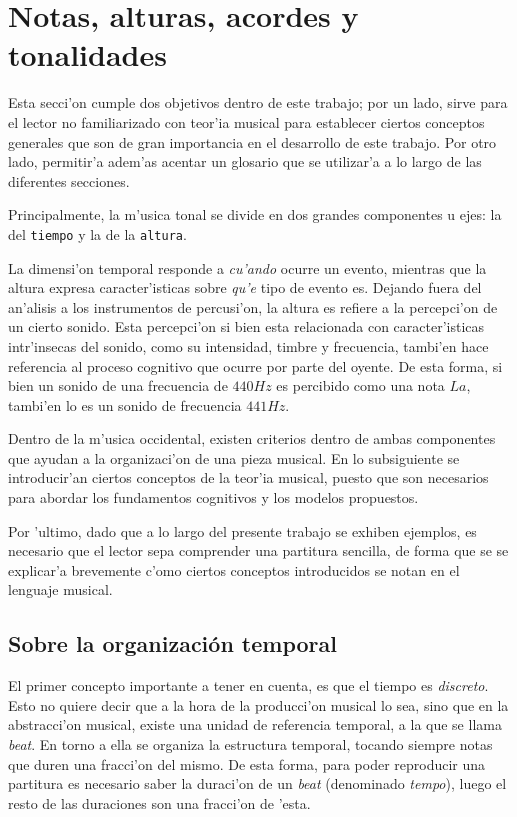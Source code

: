 \section{Notas, alturas, acordes y tonalidades}
\label{sec:musical_intro}
Esta secci'on cumple dos objetivos dentro de este trabajo; por un lado, sirve para el lector no familiarizado con teor'ia musical para establecer
ciertos conceptos generales que son de gran importancia en el desarrollo de este trabajo. Por otro lado, permitir'a adem'as acentar un glosario
que se utilizar'a a lo largo de las diferentes secciones.

Principalmente, la m'usica tonal se divide en dos grandes componentes u ejes: la del \texttt{tiempo} y la de la \texttt{altura}. 

La dimensi'on temporal responde a \emph{cu'ando} ocurre un evento, mientras que la altura expresa caracter'isticas sobre \emph{qu'e}
tipo de evento es.  Dejando fuera del an'alisis a los instrumentos de percusi'on, la altura es refiere a la percepci'on de un cierto sonido. 
Esta percepci'on si bien esta relacionada con caracter'isticas intr'insecas del sonido, como su intensidad, timbre y frecuencia, 
tambi'en hace referencia
al proceso cognitivo que ocurre por parte del oyente. De esta forma, si bien un sonido de una frecuencia de $440Hz$ es percibido como una nota 
$La$, tambi'en lo es un sonido de frecuencia $441Hz$.

Dentro de la m'usica occidental, existen criterios dentro de ambas componentes que ayudan a la organizaci'on de una pieza musical. 
En lo subsiguiente se introducir'an ciertos conceptos de la teor'ia musical, puesto que son necesarios
para abordar los fundamentos cognitivos y los modelos propuestos. 

Por 'ultimo, dado que a lo largo del presente trabajo se exhiben ejemplos, es necesario que el lector sepa comprender una partitura sencilla, de forma que se se 
explicar'a brevemente c'omo ciertos conceptos introducidos se notan en el lenguaje musical.

\subsection{Sobre la organizaci\'on temporal}
El primer concepto importante a tener en cuenta, es que el tiempo es \emph{discreto}. Esto no quiere decir que a la hora de la producci'on musical lo sea, sino que 
en la abstracci'on musical, existe una unidad de referencia temporal, a la que se llama \emph{beat}. En torno a ella se organiza la estructura temporal, tocando
siempre notas que duren una fracci'on del mismo. De esta forma, para poder reproducir una partitura es necesario saber la duraci'on de un \emph{beat} (denominado
\emph{tempo}), luego el resto de las duraciones son una fracci'on de 'esta.


